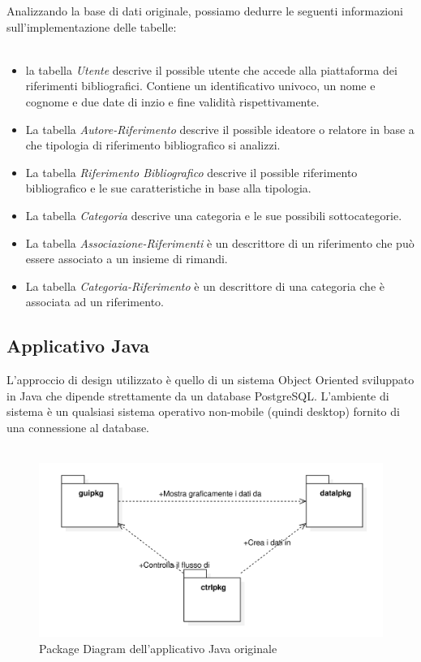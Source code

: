 Analizzando la base di dati originale, possiamo dedurre le seguenti informazioni sull'implementazione delle tabelle:
\\~\\
\begin{itemize}
    \item la tabella \textit{Utente} descrive il possible utente che accede alla piattaforma dei riferimenti bibliografici. Contiene un identificativo univoco, un nome e cognome e due date di inzio e fine validità rispettivamente. \\
    \item La tabella \textit{Autore-Riferimento} descrive il possible ideatore o relatore in base a che tipologia di riferimento bibliografico si analizzi. \\
    \item La tabella \textit{Riferimento Bibliografico} descrive il possible riferimento bibliografico e le sue caratteristiche in base alla tipologia. \\
    \item La tabella \textit{Categoria} descrive una categoria e le sue possibili sottocategorie. \\
    \item La tabella \textit{Associazione-Riferimenti} è un descrittore di un riferimento che può essere associato a un insieme di rimandi. \\
    \item La tabella \textit{Categoria-Riferimento} è un descrittore di una categoria che è associata ad  un riferimento. \\

\end{itemize}
\newpage
\raggedright{\subsection{Applicativo Java}}
L’approccio di design utilizzato è quello di un sistema Object Oriented sviluppato in Java che dipende strettamente da un database PostgreSQL. L’ambiente di sistema è un qualsiasi sistema operativo non-mobile (quindi desktop) fornito di una connessione al database.
\\~\\
\begin{figure}[H]
    \centering
        \includegraphics[width=.90\textwidth]{Immagini/VecchioProgetto/UML OO Java vecchioProgetto.png} 
    \caption{Package Diagram dell'applicativo Java originale}
\end{figure}

